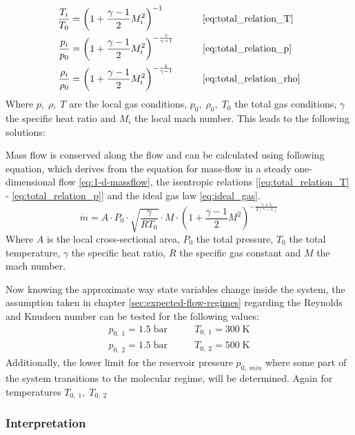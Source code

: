 	\begin{alignat*}{2}
	    \frac{T_i}{T_0}   & = \left( 1 + \frac{\gamma - 1}{2} M_i^2 \right)^{-1}
	    & \qquad & \eqref{eq:total_relation_T} \\
	    \frac{p_i}{p_0}   & = \left( 1 + \frac{\gamma - 1}{2} M_i^2 \right)^{-\frac{\gamma}{\gamma - 1}}
	    & \qquad & \eqref{eq:total_relation_p} \\
	    \frac{\rho_i}{\rho_0} & = \left( 1 + \frac{\gamma - 1}{2} M_i^2 \right)^{-\frac{1}{\gamma - 1}}
	    & \qquad & \eqref{eq:total_relation_rho}
	\end{alignat*}
	Where $p,\; \rho,\; T$ are the local gas conditions, $p_0,\; \rho_0,\; T_0$ the total gas conditions, $\gamma$ the specific heat ratio and $M_i$ the local mach number.
	This leads to the following solutions:
	
	Mass flow is conserved along the flow and can be calculated using following equation, which derives from the equation for mass-flow in a steady one-dimensional flow \eqref{eq:1-d-massflow}, the isentropic relations [\eqref{eq:total_relation_T} - \eqref{eq:total_relation_p}] and the ideal gas law \eqref{eq:ideal_gas}.
	\cite{benson_mass_nodate}
	$$
		\dot{m} = A \cdot P_0 \cdot \sqrt{\frac{\gamma}{R T_0}} \cdot M \cdot \left(1 + \frac{\gamma - 1}{2} M^2\right)^{-\frac{\gamma + 1}{2(\gamma - 1)}}
	$$
	Where $A$ is the local cross-sectional area, $P_0$ the total pressure, $T_0$ the total temperature, $\gamma$ the specific heat ratio, $R$ the specific gas constant and $M$ the mach number.
	\cite{Cantwell_AA210A}

	Now knowing the approximate way state variables change inside the system, the assumption taken in chapter \ref{sec:expected-flow-regimes} regarding the Reynolds and Knudsen number can be tested for the following values:
	\begin{align*}
		p_{0,\;1} = 1.5\;\text{bar} &\qquad T_{0,\;1} = 300\;\text{K}\\
		p_{0,\;2} = 1.5\;\text{bar} &\qquad T_{0,\;2} = 500\;\text{K}
	\end{align*}
	Additionally, the lower limit for the reservoir pressure $p_{0,\;min}$ where some part of the system transitions to the molecular regime, will be determined.
	Again for temperatures $T_{0,\;1},\;T_{0,\;2}$
	

\subsubsection*{Interpretation}
